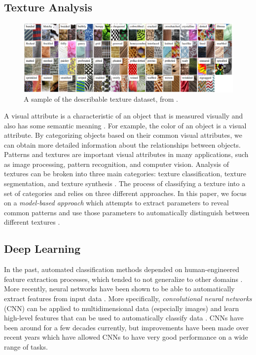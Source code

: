 \documentclass[12pt]{article}
\begin{document}
\subsection{Texture Analysis}

\begin{figure}[h]
    \centering
    \includegraphics[width=1\textwidth]{assets/images/texturedataset.png}
    \caption{A sample of the describable texture dataset, from
        \citeauthor*{cimpoi_describing_2014} \cite{cimpoi_describing_2014}. }
    \label{fig:texturedataset}
\end{figure}

A visual attribute is a characteristic of an object that is measured visually
and also has some semantic meaning \cite{cimpoi_describing_2014}. For example,
the color of an object is a visual attribute. By categorizing objects based on
their common visual attributes, we can obtain more detailed information about
the relationships between objects. Patterns and textures are important visual
attributes in many applications, such as image processing, pattern recognition,
and computer vision. Analysis of textures can be broken into three main
categories: texture classification, texture segmentation, and texture synthesis
\cite{reed_review_1993}. The process of classifying a texture into a set of
categories and relies on three different approaches. In this paper, we focus on
a \textit{model-based approach} which attempts to extract parameters to reveal
common patterns and use those parameters to automatically distinguish between
different textures \cite{maillard_texture_2003}.

\subsection{Deep Learning}

In the past, automated classification methods depended on human-engineered
feature extraction processes, which tended to not generalize to other domains
\cite{duda_pattern_2001}. More recently, neural networks have been shown to be
able to automatically extract features from input data \cite{arel_deep_2010}.
More specifically, \textit{convolutional neural networks} (CNN) can be applied
to multidimensional data (especially images) and learn high-level features that
can be used to automatically classify data \cite{lecun_gradient_1998}. CNNs have
been around for a few decades currently, but improvements have been made over
recent years which have allowed CNNs to have very good performance on a wide
range of tasks.
\end{document}
